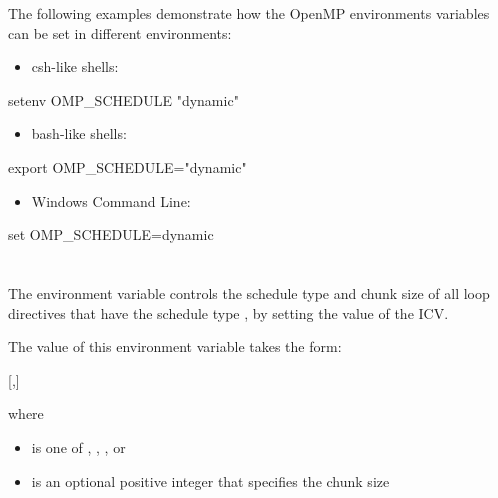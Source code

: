 The following examples demonstrate how the OpenMP environments variables can
be set in different environments:

\begin{itemize}
\item csh-like shells:
\end{itemize}

\begin{boxedcode}
setenv OMP\_SCHEDULE "dynamic"
\end{boxedcode}

\begin{itemize}
\item bash-like shells:
\end{itemize}

\begin{boxedcode}
export OMP\_SCHEDULE="dynamic"
\end{boxedcode}

\begin{itemize}
\item Windows Command Line:
\end{itemize}

\begin{boxedcode}
set OMP\_SCHEDULE=dynamic
\end{boxedcode}










\section{}
\label{sec:OMP_SCHEDULE}
The  environment variable controls the schedule type and chunk size 
of all loop directives that have the schedule type , by setting the value of the 
 ICV.

The value of this environment variable takes the form:

[,]

where

\begin{itemize}
\item {} is one of , , , or 

\item {} is an optional positive integer that specifies the chunk size
\end{itemize}

